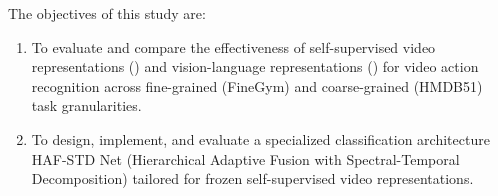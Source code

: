 The objectives of this study are:
\begin{enumerate}[leftmargin=*]
    \item To evaluate and compare the effectiveness of self-supervised video representations (\vjepaa{}) and vision-language representations (\qwenvl{}) for video action recognition across fine-grained (FineGym) and coarse-grained (HMDB51) task granularities.
    \item To design, implement, and evaluate a specialized classification architecture HAF-STD Net (Hierarchical Adaptive Fusion with Spectral-Temporal Decomposition) tailored for frozen self-supervised video representations.
\end{enumerate}

